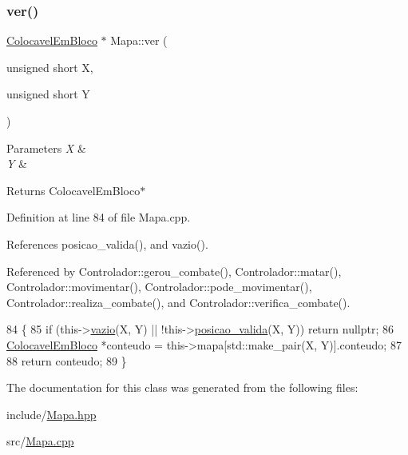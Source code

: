 \subsubsection{\texorpdfstring{ver()}{ver()}}
{\footnotesize\ttfamily \mbox{\hyperlink{class_colocavel_em_bloco}{Colocavel\+Em\+Bloco}} $\ast$ Mapa\+::ver (\begin{DoxyParamCaption}\item[{unsigned short}]{X,  }\item[{unsigned short}]{Y }\end{DoxyParamCaption})}


\begin{DoxyParams}{Parameters}
{\em X} & \\
\hline
{\em Y} & \\
\hline
\end{DoxyParams}
\begin{DoxyReturn}{Returns}
Colocavel\+Em\+Bloco$\ast$ 
\end{DoxyReturn}


Definition at line 84 of file Mapa.\+cpp.



References posicao\+\_\+valida(), and vazio().



Referenced by Controlador\+::gerou\+\_\+combate(), Controlador\+::matar(), Controlador\+::movimentar(), Controlador\+::pode\+\_\+movimentar(), Controlador\+::realiza\+\_\+combate(), and Controlador\+::verifica\+\_\+combate().


\begin{DoxyCode}
84                                                               \{
85     \textcolor{keywordflow}{if} (this->\mbox{\hyperlink{class_mapa_a5bdde997d3c97c5b6fb7d37c124cdf93}{vazio}}(X, Y) || !this->\mbox{\hyperlink{class_mapa_aa07c1444720958b3efbc734d2691361d}{posicao\_valida}}(X, Y)) \textcolor{keywordflow}{return} \textcolor{keyword}{nullptr};
86     \mbox{\hyperlink{class_colocavel_em_bloco}{ColocavelEmBloco}} *conteudo = this->mapa[std::make\_pair(X, Y)].conteudo;
87 
88     \textcolor{keywordflow}{return} conteudo;
89 \}
\end{DoxyCode}


The documentation for this class was generated from the following files\+:\begin{DoxyCompactItemize}
\item 
include/\mbox{\hyperlink{_mapa_8hpp}{Mapa.\+hpp}}\item 
src/\mbox{\hyperlink{_mapa_8cpp}{Mapa.\+cpp}}\end{DoxyCompactItemize}
